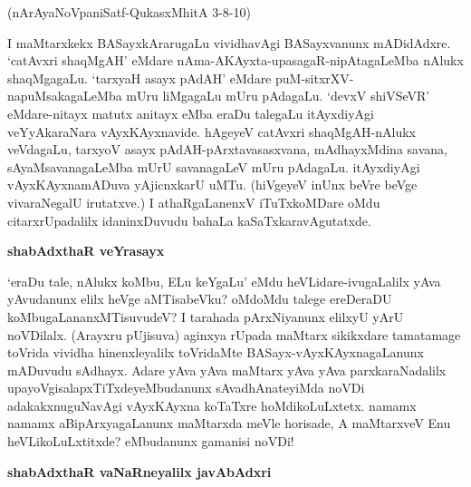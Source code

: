 \noindent
(nArAyaNoVpaniSatf-QukasxMhitA 3-8-10)

I maMtarxkekx BASayxkArarugaLu vividhavAgi BASayxvanunx mADidAdxre. 
`catAvxri shaqMgAH' eMdare nAma\--AKAyxta-upasagaR-nipAtagaLeMba nAlukx 
shaqMgagaLu. `tarxyaH asayx pAdAH' eMdare puM-sitxrXV-napuM\-saka\-gaLeMba 
mUru liMgagaLu mUru pAdagaLu. `devxV shiVSeVR' eMdare-nitayx matutx 
anitayx eMba eraDu talegaLu itAyxdiyAgi veYyAkaraNara vAyxKAyxnavide. hAgeyeV catAvxri shaqMgAH-nAlukx veVda\-gaLu, tarxyoV asayx pAdAH-pArxtavasasxvana, mAdhayxMdina savana, sAyaMsavanagaLeMba mUrU savana\-gaLeV mUru pAdagaLu. itAyxdiyAgi vAyxKAyxnamADuva yAjicnxkarU uMTu. (hiVgeyeV inUnx beVre beVge vivaraNegalU irutatxve.) I athaRgaLanenxV iTuTxkoMDare oMdu citarxrUpadalilx idaninxDu\-vudu bahaLa kaSaTxkaravAgutatxde.

{\bigskip
\noindent
{\large\bf shabAdxthaR veYrasayx}}\label{page112}
\medskip

\noindent
`eraDu tale, nAlukx koMbu, ELu keYgaLu' eMdu heVLidare-ivugaLalilx yAva 
yAvudanunx elilx heVge aMTisabeVku? oMdoMdu talege ereDeraDU koMbu\-gaLananxMTisuvudeV? I tarahada pArxNi\-yanunx elilxyU yArU noVDilalx. (Arayxru pUjisuva) aginxya rUpada maMtarx sikikxdare tamatamage toVrida vividha hinenxle\-yalilx toVridaMte BASayx-vAyxKAyxnagaLanunx mADuvudu sAdhayx. Adare yAva yAva maMtarx\- yAva yAva parxkaraNadalilx upayoVgisalapxTiTxdeyeMbudanunx sAva\-dhAnateyiMda noVDi adakakxnu\-guNa\-vAgi vAyxKAyxna koTaTxre hoMdikoLuLxtetx. namamx namamx aBipArxyagaLanunx maMtarxda meVle hori\-sade, A maMtarxveV Enu heVLikoLuLx\-titxde? eMbudanunx gamanisi noVDi!

{\bigskip
\noindent
{\large\bf shabAdxthaR vaNaRneyalilx javAbAdxri}}\label{page112}
\medskip

